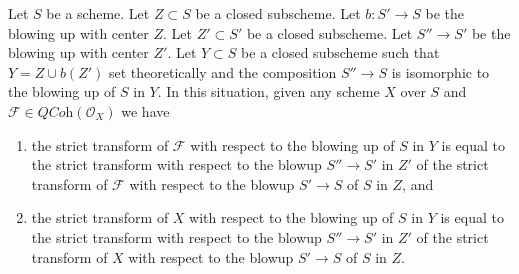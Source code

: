 \begin{lemma}
\label{lemma-strict-transform-composition-blowups}
Let $S$ be a scheme. Let $Z \subset S$ be a closed subscheme.
Let $b : S' \to S$ be the blowing up with center $Z$. Let $Z' \subset S'$ be
a closed subscheme. Let $S'' \to S'$ be the blowing up with center $Z'$.
Let $Y \subset S$ be a closed subscheme such that
$Y = Z \cup b(Z')$ set theoretically and the composition $S'' \to S$
is isomorphic to the blowing up of $S$ in $Y$.
In this situation, given any scheme $X$ over $S$ and
$\mathcal{F} \in \textit{QCoh}(\mathcal{O}_X)$ we have
\begin{enumerate}
\item the strict transform of $\mathcal{F}$ with respect to the blowing
up of $S$ in $Y$ is equal to the strict transform with respect to the
blowup $S'' \to S'$ in $Z'$ of the strict transform of $\mathcal{F}$
with respect to the blowup $S' \to S$ of $S$ in $Z$, and
\item the strict transform of $X$ with respect to the blowing
up of $S$ in $Y$ is equal to the strict transform with respect to the
blowup $S'' \to S'$ in $Z'$ of the strict transform of $X$
with respect to the blowup $S' \to S$ of $S$ in $Z$.
\end{enumerate}
\end{lemma}

